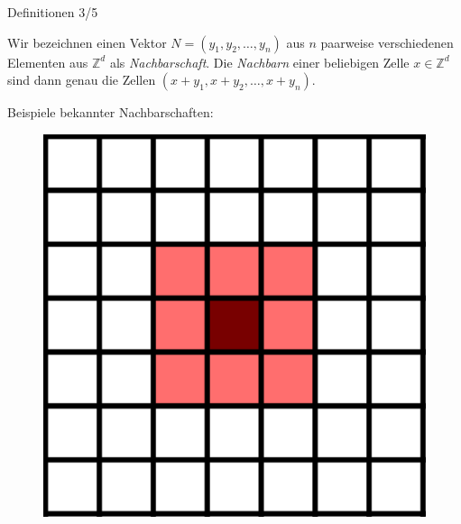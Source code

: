\documentclass[aspectratio=169]{beamer}
\begin{document}
  \begin{frame}{Definitionen 3/5}
    \begin{definition*}[Nachbarschaft]
      Wir bezeichnen einen Vektor $N = (y_1, y_2, \dots, y_n)$ aus $n$ paarweise verschiedenen Elementen aus $\mathbb{Z}^d$ als \textit{Nachbarschaft}. Die \textit{Nachbarn} einer beliebigen Zelle $x \in \mathbb{Z}^d$ sind dann genau die Zellen $(x + y_1, x + y_2, \dots, x + y_n)$.
    \end{definition*}

    \pause

    Beispiele bekannter Nachbarschaften:

    \begin{multicols*}{2}
      \begin{multicols*}{2}
        \begin{figure}[H]
          \centering
          \includegraphics[width = 0.28 \textheight]{moore_1.png}
        \end{figure}


\end{multicols*}
\end{multicols*}
\end{frame}
\end{document}
